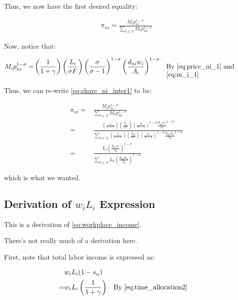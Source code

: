 \documentclass[10pt]{article}
\begin{document}
Thus, we now have the first desired equality:

\begin{align}
    \pi_{n i}=\frac{M_i p_{n i}^{1-\sigma}}{\sum_{k \in N} M_k p_{n k}^{1-\sigma}} \label{eq:share_ni_inter1}
\end{align}

Now, notice that:

\begin{align}
    M_i p_{ni}^{1-\sigma} = &\left(\frac{1}{1 + \gamma}\right)\left(\frac{L_i}{\sigma F}\right) \left(\frac{\sigma}{\sigma-1}\right)^{1-\sigma} \left(\frac{d_{ni} w_i}{A_i}\right)^{1-\sigma} && \parbox[t]{4cm}{\raggedright By \eqref{eq:price_ni_1} and \eqref{eq:m_i_1}}
\end{align}

Thus, we can re-write \eqref{eq:share_ni_inter1} to be: 

\begin{align}
    \pi_{n i}=&\frac{M_i p_{n i}^{1-\sigma}}{\sum_{k \in N} M_k p_{n k}^{1-\sigma}} \\
    = &\frac{\left(\frac{1}{1 + \gamma}\right)\left(\frac{L_i}{\sigma F}\right) \left(\frac{\sigma}{\sigma-1}\right)^{1-\sigma} \frac{d_{ni} w_i}{A_i}^{1-\sigma}}{\sum_{k \in N} \left(\frac{1}{1 + \gamma}\right)\left(\frac{L_k}{\sigma F}\right) \left(\frac{\sigma}{\sigma-1}\right)^{1-\sigma} \frac{d_{nk} w_k}{A_k}^{1-\sigma}} \\
    = &\frac{L_i \left(\frac{d_{ni} w_i}{A_i}\right)^{1-\sigma}}{\sum_{k \in N} L_k \left(\frac{d_{nk} w_k}{A_k}\right)^{1-\sigma}}
\end{align}

which is what we wanted.

\subsection{Derivation of $w_i L_i$ Expression}
\label{sec:workplace_income}

This is a derivation of \eqref{eq:workplace_income}.

There's not really much of a derivation here. 

First, note that total labor income is expressed as:

\begin{align}
    &w_i L_i (1- s_\omega) \\
    = &w_i L_i \left(\frac{1}{1+\gamma}\right) && \text{By \eqref{eq:time_allocation2}}
\end{align}
\end{document}

